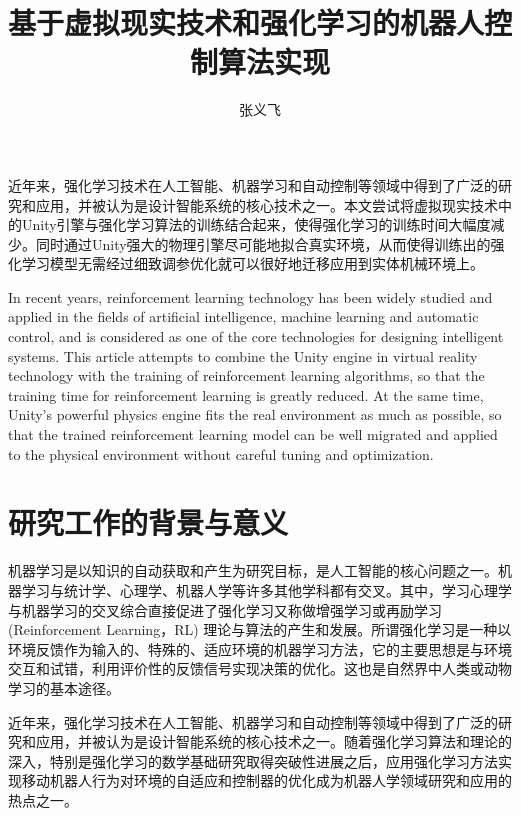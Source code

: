\documentclass[bachelor]{thesis-uestc}
\title{基于虚拟现实技术和强化学习的机器人控制算法实现}
\author{张义飞}
\begin{document}
	
	\begin{chineseabstract}
		近年来，强化学习技术在人工智能、机器学习和自动控制等领域中得到了广泛的研究和应用，并被认为是设计智能系统的核心技术之一。本文尝试将虚拟现实技术中的Unity引擎与强化学习算法的训练结合起来，使得强化学习的训练时间大幅度减少。同时通过Unity强大的物理引擎尽可能地拟合真实环境，从而使得训练出的强化学习模型无需经过细致调参优化就可以很好地迁移应用到实体机械环境上。
		
	\end{chineseabstract}
	
	\begin{englishabstract}
		In recent years, reinforcement learning technology has been widely studied and applied in the fields of artificial intelligence, machine learning and automatic control, and is considered as one of the core technologies for designing intelligent systems. This article attempts to combine the Unity engine in virtual reality technology with the training of reinforcement learning algorithms, so that the training time for reinforcement learning is greatly reduced. At the same time, Unity's powerful physics engine fits the real environment as much as possible, so that the trained reinforcement learning model can be well migrated and applied to the physical environment without careful tuning and optimization.
		
	\end{englishabstract}
	
	\thesistableofcontents
	
	\thesischapterexordium
	
	\section{研究工作的背景与意义}
	
	机器学习是以知识的自动获取和产生为研究目标，是人工智能的核心问题之一。机器学习与统计学、心理学、机器人学等许多其他学科都有交叉。其中，学习心理学与机器学习的交叉综合直接促进了强化学习又称做增强学习或再励学习(Reinforcement Learning，RL) 理论与算法的产生和发展。所谓强化学习是一种以环境反馈作为输入的、特殊的、适应环境的机器学习方法，它的主要思想是与环境交互和试错，利用评价性的反馈信号实现决策的优化。这也是自然界中人类或动物学习的基本途径。
	
	近年来，强化学习技术在人工智能、机器学习和自动控制等领域中得到了广泛的研究和应用，并被认为是设计智能系统的核心技术之一。随着强化学习算法和理论的深入，特别是强化学习的数学基础研究取得突破性进展之后，应用强化学习方法实现移动机器人行为对环境的自适应和控制器的优化成为机器人学领域研究和应用的热点之一。
	
\end{document}
